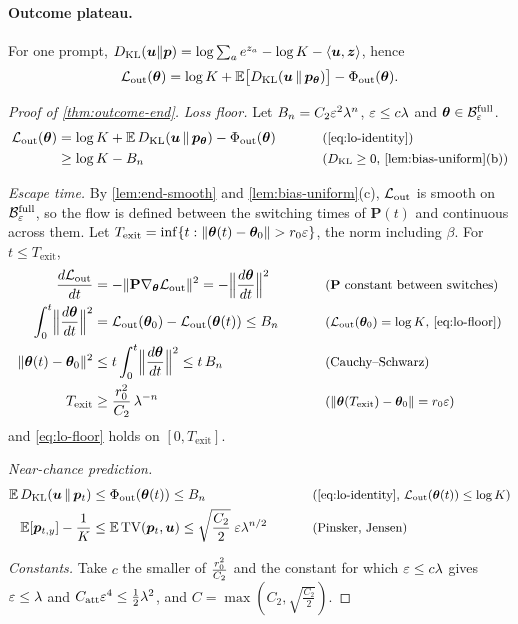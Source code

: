 \paragraph{Outcome plateau.}\label{app:end} For one prompt, $D_{\mathrm{KL}}(\bm u\|\bm p)=\log\sum_ae^{z_a}-\log K-\langle\bm u,\bm z\rangle$, hence
\begin{equation}
 \mathcal L_{\mathrm{out}}(\bm\theta)=\log K+\mathbb E\bigl[D_{\mathrm{KL}}(\bm u\,\|\,\bm p_{\bm\theta})\bigr]-\Phi_{\mathrm{out}}(\bm\theta).
 \label{eq:lo-identity}
\end{equation}

\begin{proof}[Proof of \cref{thm:outcome-end}]
\emph{Loss floor.} Let $B_n=C_2\varepsilon^2\lambda^n$, $\varepsilon\le c\lambda$ and $\bm\theta\in\mathcal B^{\mathrm{full}}_{\varepsilon}$.
\begin{alignat}{2}
 \Lout(\bm\theta)&=\log K+\E\,\KL(\bm u\,\|\,\bm p_{\bm\theta})-\outcredit(\bm\theta) &\qquad& \why{\cref{eq:lo-identity}}\nonumber\\
 &\ge\log K-B_n && \why{$\KL\ge0$, \cref{lem:bias-uniform}(b)}\label{eq:lo-floor}
\end{alignat}

\emph{Escape time.} By \cref{lem:end-smooth} and \cref{lem:bias-uniform}(c), $\mathcal L_{\mathrm{out}}$ is smooth on $\mathcal B^{\mathrm{full}}_{\varepsilon}$, so the flow is defined between the
switching times of $\mathbf P(t)$ and continuous across them. Let $T_{\mathrm{exit}}=\inf\{t:\|\bm\theta(t)-\bm\theta_0\|>\ballradius\initscale\}$, the norm
including $\beta$. For $t\le T_{\mathrm{exit}}$,
\begin{alignat*}{2}
 \ddt{\Lout}&=-\|\mathbf P\nabla_{\bm\theta}\Lout\|^2=-\Bigl\|\ddt{\bm\theta}\Bigr\|^2 &\qquad& \why{$\mathbf P$ constant between switches}\\
 \int_0^t\Bigl\|\ddt{\bm\theta}\Bigr\|^2&=\Lout(\bm\theta_0)-\Lout(\bm\theta(t))\le B_n && \why{$\Lout(\bm\theta_0)=\log K$, \cref{eq:lo-floor}}\\
 \|\bm\theta(t)-\bm\theta_0\|^2&\le t\int_0^t\Bigl\|\ddt{\bm\theta}\Bigr\|^2\le t\,B_n && \why{Cauchy--Schwarz}\\
 T_{\mathrm{exit}}&\ge\frac{\ballradius^2}{C_2}\,\mixrate^{-n} && \why{$\|\bm\theta(T_{\mathrm{exit}})-\bm\theta_0\|=\ballradius\initscale$}
\end{alignat*}
and \cref{eq:lo-floor} holds on $[0,T_{\mathrm{exit}}]$.

\emph{Near-chance prediction.}
\begin{alignat*}{2}
 \E\,\KL(\bm u\,\|\,\bm p_t)&\le\outcredit(\bm\theta(t))\le B_n &\qquad& \why{\cref{eq:lo-identity}, $\Lout(\bm\theta(t))\le\log K$}\\
 \E[\bm p_{t,y}]-\tfrac{1}{K}&\le\E\,\mathrm{TV}(\bm p_t,\bm u)\le\sqrt{\frac{C_2}{2}}\;\initscale\mixrate^{n/2} && \why{Pinsker, Jensen}
\end{alignat*}

\emph{Constants.} Take $c$ the smaller of $\frac{r_0^2}{C_2}$ and the constant for which $\varepsilon\le c\lambda$ gives $\varepsilon\le\lambda$ and
$C_{\mathrm{att}}\varepsilon^4\le\frac{1}{2}\lambda^2$, and $C=\max(C_2,\sqrt{\frac{C_2}{2}})$.
\end{proof}
